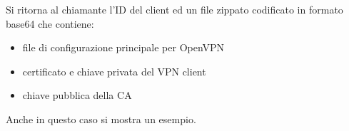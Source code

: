 Si ritorna al chiamante l'ID del client ed un file zippato codificato in formato
base64 che contiene:
\begin{itemize}
    \item file di configurazione principale per OpenVPN
    \item certificato e chiave privata del VPN client
    \item chiave pubblica della CA
\end{itemize}
Anche in questo caso si mostra un esempio.
\inputminted[tabsize=4, breaklines]{python}{code_samples/controllers_create_client.py}